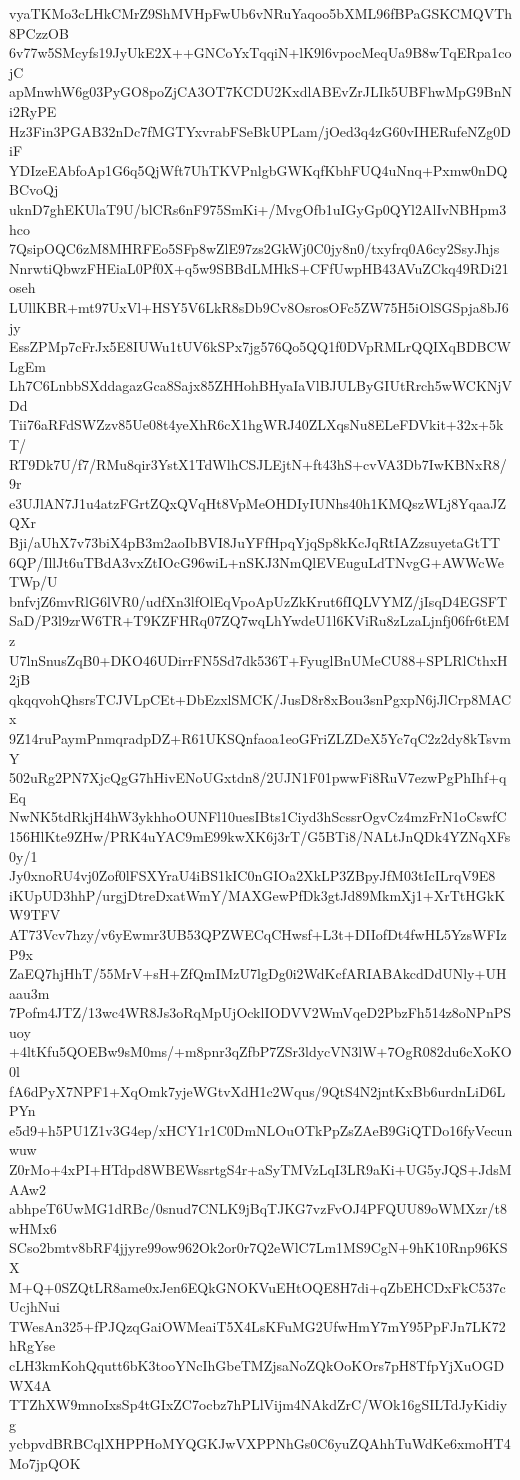 vyaTKMo3cLHkCMrZ9ShMVHpFwUb6vNRuYaqoo5bXML96fBPaGSKCMQVTh8PCzzOB
6v77w5SMcyfs19JyUkE2X++GNCoYxTqqiN+lK9l6vpocMeqUa9B8wTqERpa1cojC
apMnwhW6g03PyGO8poZjCA3OT7KCDU2KxdlABEvZrJLIk5UBFhwMpG9BnNi2RyPE
Hz3Fin3PGAB32nDc7fMGTYxvrabFSeBkUPLam/jOed3q4zG60vIHERufeNZg0DiF
YDIzeEAbfoAp1G6q5QjWft7UhTKVPnlgbGWKqfKbhFUQ4uNnq+Pxmw0nDQBCvoQj
uknD7ghEKUlaT9U/blCRs6nF975SmKi+/MvgOfb1uIGyGp0QYl2AlIvNBHpm3hco
7QsipOQC6zM8MHRFEo5SFp8wZlE97zs2GkWj0C0jy8n0/txyfrq0A6cy2SsyJhjs
NnrwtiQbwzFHEiaL0Pf0X+q5w9SBBdLMHkS+CFfUwpHB43AVuZCkq49RDi21oseh
LUllKBR+mt97UxVl+HSY5V6LkR8sDb9Cv8OsrosOFc5ZW75H5iOlSGSpja8bJ6jy
EssZPMp7cFrJx5E8IUWu1tUV6kSPx7jg576Qo5QQ1f0DVpRMLrQQIXqBDBCWLgEm
Lh7C6LnbbSXddagazGca8Sajx85ZHHohBHyaIaVlBJULByGIUtRrch5wWCKNjVDd
Tii76aRFdSWZzv85Ue08t4yeXhR6cX1hgWRJ40ZLXqsNu8ELeFDVkit+32x+5kT/
RT9Dk7U/f7/RMu8qir3YstX1TdWlhCSJLEjtN+ft43hS+cvVA3Db7IwKBNxR8/9r
e3UJlAN7J1u4atzFGrtZQxQVqHt8VpMeOHDIyIUNhs40h1KMQszWLj8YqaaJZQXr
Bji/aUhX7v73biX4pB3m2aoIbBVI8JuYFfHpqYjqSp8kKcJqRtIAZzsuyetaGtTT
6QP/IllJt6uTBdA3vxZtIOcG96wiL+nSKJ3NmQlEVEuguLdTNvgG+AWWcWeTWp/U
bnfvjZ6mvRlG6lVR0/udfXn3lfOlEqVpoApUzZkKrut6fIQLVYMZ/jIsqD4EGSFT
SaD/P3l9zrW6TR+T9KZFHRq07ZQ7wqLhYwdeU1l6KViRu8zLzaLjnfj06fr6tEMz
U7lnSnusZqB0+DKO46UDirrFN5Sd7dk536T+FyuglBnUMeCU88+SPLRlCthxH2jB
qkqqvohQhsrsTCJVLpCEt+DbEzxlSMCK/JusD8r8xBou3snPgxpN6jJlCrp8MACx
9Z14ruPaymPnmqradpDZ+R61UKSQnfaoa1eoGFriZLZDeX5Yc7qC2z2dy8kTsvmY
502uRg2PN7XjcQgG7hHivENoUGxtdn8/2UJN1F01pwwFi8RuV7ezwPgPhIhf+qEq
NwNK5tdRkjH4hW3ykhhoOUNFl10uesIBts1Ciyd3hScssrOgvCz4mzFrN1oCswfC
156HlKte9ZHw/PRK4uYAC9mE99kwXK6j3rT/G5BTi8/NALtJnQDk4YZNqXFs0y/1
Jy0xnoRU4vj0Zof0lFSXYraU4iBS1kIC0nGIOa2XkLP3ZBpyJfM03tIcILrqV9E8
iKUpUD3hhP/urgjDtreDxatWmY/MAXGewPfDk3gtJd89MkmXj1+XrTtHGkKW9TFV
AT73Vcv7hzy/v6yEwmr3UB53QPZWECqCHwsf+L3t+DIIofDt4fwHL5YzsWFIzP9x
ZaEQ7hjHhT/55MrV+sH+ZfQmIMzU7lgDg0i2WdKcfARIABAkcdDdUNly+UHaau3m
7Pofm4JTZ/13wc4WR8Js3oRqMpUjOcklIODVV2WmVqeD2PbzFh514z8oNPnPSuoy
+4ltKfu5QOEBw9sM0ms/+m8pnr3qZfbP7ZSr3ldycVN3lW+7OgR082du6cXoKO0l
fA6dPyX7NPF1+XqOmk7yjeWGtvXdH1c2Wqus/9QtS4N2jntKxBb6urdnLiD6LPYn
e5d9+h5PU1Z1v3G4ep/xHCY1r1C0DmNLOuOTkPpZsZAeB9GiQTDo16fyVecunwuw
Z0rMo+4xPI+HTdpd8WBEWssrtgS4r+aSyTMVzLqI3LR9aKi+UG5yJQS+JdsMAAw2
abhpeT6UwMG1dRBc/0snud7CNLK9jBqTJKG7vzFvOJ4PFQUU89oWMXzr/t8wHMx6
SCso2bmtv8bRF4jjyre99ow962Ok2or0r7Q2eWlC7Lm1MS9CgN+9hK10Rnp96KSX
M+Q+0SZQtLR8ame0xJen6EQkGNOKVuEHtOQE8H7di+qZbEHCDxFkC537cUcjhNui
TWesAn325+fPJQzqGaiOWMeaiT5X4LsKFuMG2UfwHmY7mY95PpFJn7LK72hRgYse
cLH3kmKohQqutt6bK3tooYNcIhGbeTMZjsaNoZQkOoKOrs7pH8TfpYjXuOGDWX4A
TTZhXW9mnoIxsSp4tGIxZC7ocbz7hPLlVijm4NAkdZrC/WOk16gSILTdJyKidiyg
ycbpvdBRBCqlXHPPHoMYQGKJwVXPPNhGs0C6yuZQAhhTuWdKe6xmoHT4Mo7jpQOK
